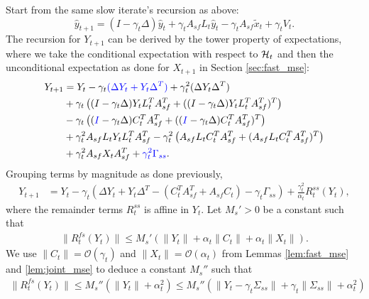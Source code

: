 Start from the same slow iterate's recursion as above:
\begin{equation}
    \hat{y}_{t+1} = (I - \gamma_t \Delta) \hat{y}_t + \gamma_t A_{sf} L_t \hat{y}_t - \gamma_t A_{sf} \tilde{x}_t + \gamma_t V_t .
\end{equation}
The recursion for $Y_{t+1}$ can be derived by the tower property of expectations, where we take the conditional expectation with respect to $\mathcal{H}_t$ and then the unconditional expectation as done for $X_{t+1}$ in Section \ref{sec:fast_mse}:
\begin{align*}
    Y_{t+1} &= Y_t - \gamma_t {\color{blue}(\Delta Y_t + Y_t \Delta^T)} + \gamma_t^2 (\Delta Y_t \Delta^T)
    \\
    &
    + \gamma_t \left((I - \gamma_t \Delta) Y_t L_t^T A_{sf}^T + ((I - \gamma_t \Delta) Y_t L_t^T A_{sf}^T)^T\right)
    \\ & 
    - \gamma_t \left( ({\color{blue}I} - \gamma_t \Delta) C_t^T A_{sf}^T + (({\color{blue}I} - \gamma_t \Delta) C_t^T A_{sf}^T)^T\right)
    \\
    &+ \gamma_t^2 A_{sf} L_t Y_t L_t^T A_{sf}^T
    - \gamma_t^2 \left(A_{sf} L_t C_t^T A_{sf}^T + (A_{sf} L_t C_t^T A_{sf}^T)^T\right) 
    \\
    &+ \gamma_t^2 A_{sf} X_t A_{sf}^T 
    + {\color{blue}\gamma_t^2 \Gamma_{ss} } .
\end{align*}
Grouping terms by magnitude as done previously,
\begin{align*}
    Y_{t+1} &= Y_t
    - \gamma_t \left(\Delta Y_t + Y_t \Delta^T - (C_t^T A_{sf}^T + A_{sf} C_t) - \gamma_t \Gamma_{ss}  \right)
    + \frac{\gamma_t^2}{\alpha_t} R_t^{ss} (Y_t) ,
\end{align*}
where the remainder terms $R_t^{ss}$ is affine in $Y_t$.
Let $M_s' > 0$ be a constant such that
\begin{align*}
    \lVert R_t^{fs} (Y_t) \rVert 
    \leq 
    M_s' \left(\lVert Y_t \rVert 
    + \alpha_t \lVert C_t \rVert 
    + \alpha_t \lVert X_t \rVert 
    \right) .
\end{align*}
We use $\lVert C_t \rVert = \mathcal{O}(\gamma_t  )$ and $\lVert X_t \rVert = \mathcal{O}(\alpha_t )$ from Lemmas \ref{lem:fast_mse} and \ref{lem:joint_mse} to deduce a constant $M_s''$ such that
\begin{align*}
    \lVert R_t^{fs} (Y_t) \rVert 
    \leq 
    M_s'' \left(\lVert Y_t \rVert 
    + \alpha_t^2\right) 
    \leq
    M_s'' \left(\lVert Y_t - \gamma_t \Sigma_{ss} \rVert 
    + \gamma_t \lVert \Sigma_{ss}\rVert 
    + \alpha_t^2 \right) 
\end{align*}    
